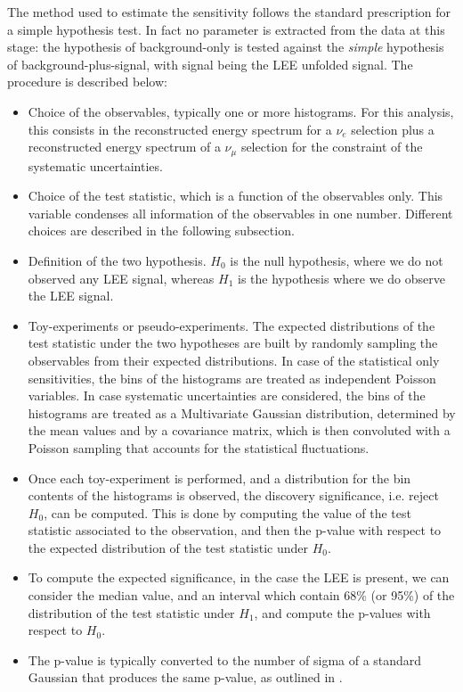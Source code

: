 \documentclass[a4paper]{article}
\newcommand{\nue}{$\nu_e$ }
\newcommand{\numu}{$\nu_{\mu}$ }
\begin{document}
The method used to estimate the sensitivity follows the standard prescription for a simple hypothesis test.
In fact no parameter is extracted from the data at this stage: the hypothesis of background-only is tested against the \textit{simple} hypothesis of background-plus-signal, with signal being the LEE unfolded signal.
The procedure is described below:
\begin{itemize}
    \item Choice of the observables, typically one or more histograms. For this analysis, this consists in the reconstructed energy spectrum for a \nue selection plus a reconstructed energy spectrum of a \numu selection for the constraint of the systematic uncertainties.
    \item Choice of the test statistic, which is a function of the observables only. This variable condenses all information of the observables in one number. Different choices are described in the following subsection.
    \item Definition of the two hypothesis. $H_0$ is the null hypothesis, where we do not observed any LEE signal, whereas $H_1$ is the hypothesis where we do observe the LEE signal.
    \item Toy-experiments or pseudo-experiments. The expected distributions of the test statistic under the two hypotheses are built by randomly sampling the observables from their expected distributions. In case of the statistical only sensitivities, the bins of the histograms are treated as independent Poisson variables. In case systematic uncertainties are considered, the bins of the histograms are treated as a Multivariate Gaussian distribution, determined by the mean values and by a covariance matrix, which is then convoluted with a Poisson sampling that accounts for the statistical fluctuations.
    \item Once each toy-experiment is performed, and a distribution for the bin contents of the histograms is observed, the discovery significance, i.e. reject $H_0$, can be computed. This is done by computing the value of the test statistic associated to the observation, and then the p-value with respect to the expected distribution of the test statistic under $H_0$.
    \item To compute the expected significance, in the case the LEE is present, we can consider the median value, and an interval which contain 68\% (or 95\%) of the distribution of the test statistic under $H_1$, and compute the p-values with respect to $H_0$.
    \item The p-value is typically converted to the number of sigma of a standard Gaussian that produces the same p-value, as outlined in \cite{bib:cowan}.
\end{itemize}
\end{document}

